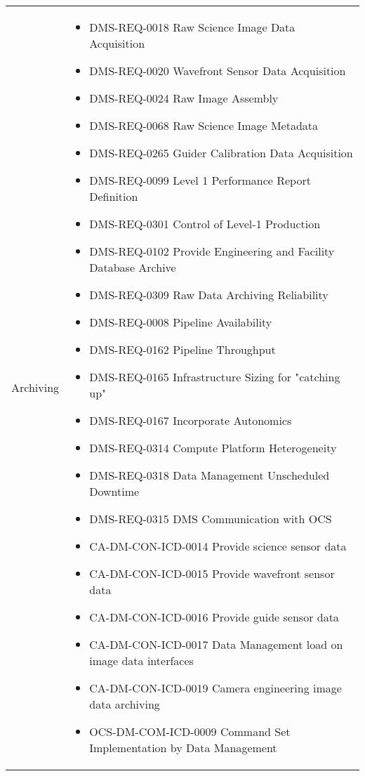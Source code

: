 \footnotesize
\begin{xtabular}{lp{0.7\textwidth}}

Archiving &
\begin{itemize}DMS-REQ-0346 Data Availability
\item DMS-REQ-0018 Raw Science Image Data Acquisition
\item DMS-REQ-0020 Wavefront Sensor Data Acquisition
\item DMS-REQ-0024 Raw Image Assembly
\item DMS-REQ-0068 Raw Science Image Metadata
\item DMS-REQ-0265 Guider Calibration Data Acquisition
\item DMS-REQ-0099 Level 1 Performance Report Definition
\item DMS-REQ-0301 Control of Level-1 Production
\item DMS-REQ-0102 Provide Engineering and Facility Database Archive
\item DMS-REQ-0309 Raw Data Archiving Reliability
\item DMS-REQ-0008 Pipeline Availability
\item DMS-REQ-0162 Pipeline Throughput
\item DMS-REQ-0165 Infrastructure Sizing for "catching up"
\item DMS-REQ-0167 Incorporate Autonomics
\item DMS-REQ-0314 Compute Platform Heterogeneity
\item DMS-REQ-0318 Data Management Unscheduled Downtime
\item DMS-REQ-0315 DMS Communication with OCS
\item CA-DM-CON-ICD-0014 Provide science sensor data
\item CA-DM-CON-ICD-0015 Provide wavefront sensor data
\item CA-DM-CON-ICD-0016 Provide guide sensor data
\item CA-DM-CON-ICD-0017 Data Management load on image data interfaces
\item CA-DM-CON-ICD-0019 Camera engineering image data archiving
\item OCS-DM-COM-ICD-0009 Command Set Implementation by Data Management

\end{itemize}
\end{xtabular}
